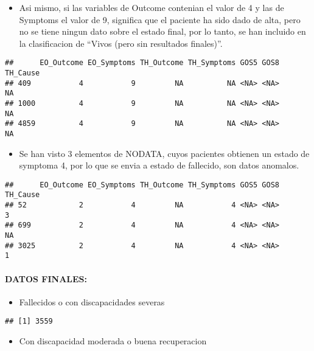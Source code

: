 \documentclass[]{article}
\providecommand{\tightlist}{%
  \setlength{\itemsep}{0pt}\setlength{\parskip}{0pt}}
\let\oldparagraph\paragraph
\renewcommand{\paragraph}[1]{\oldparagraph{#1}\mbox{}}
\begin{document}
\begin{itemize}
\tightlist
\item
  Asi mismo, si las variables de Outcome contenian el valor de 4 y las
  de Symptoms el valor de 9, significa que el paciente ha sido dado de
  alta, pero no se tiene ningun dato sobre el estado final, por lo
  tanto, se han incluido en la clasificacion de ``Vivos (pero sin
  resultados finales)''.
\end{itemize}

\begin{verbatim}
##      EO_Outcome EO_Symptoms TH_Outcome TH_Symptoms GOS5 GOS8 TH_Cause
## 409           4           9         NA          NA <NA> <NA>       NA
## 1000          4           9         NA          NA <NA> <NA>       NA
## 4859          4           9         NA          NA <NA> <NA>       NA
\end{verbatim}

\begin{itemize}
\tightlist
\item
  Se han visto 3 elementos de NODATA, cuyos pacientes obtienen un estado
  de symptoma 4, por lo que se envia a estado de fallecido, son datos
  anomalos.
\end{itemize}

\begin{verbatim}
##      EO_Outcome EO_Symptoms TH_Outcome TH_Symptoms GOS5 GOS8 TH_Cause
## 52            2           4         NA           4 <NA> <NA>        3
## 699           2           4         NA           4 <NA> <NA>       NA
## 3025          2           4         NA           4 <NA> <NA>        1
\end{verbatim}

\paragraph{DATOS FINALES:}\label{datos-finales}

\begin{itemize}
\tightlist
\item
  Fallecidos o con discapacidades severas
\end{itemize}

\begin{verbatim}
## [1] 3559
\end{verbatim}

\begin{itemize}
\tightlist
\item
  Con discapacidad moderada o buena recuperacion
\end{itemize}
\end{document}

